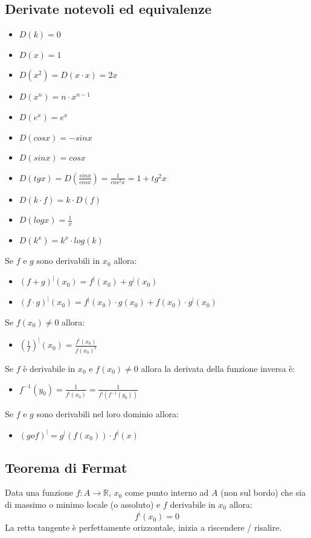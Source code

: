 \documentclass[12pt,a4paper]{article}
\begin{document}
\subsection{Derivate notevoli ed equivalenze}
\begin{itemize}
  \item $D(k) = 0$
  \item $D(x) = 1$
  \item $D(x^2) = D(x \cdot x) = 2x$
  \item $D(x^n) = n \cdot x^{n-1}$
  \item $D(e^x) = e^x$
  \item $D(cosx) = -sinx$
  \item $D(sinx) = cosx$
  \item $D(tgx) = D(\frac{sinx}{cosx}) = \frac{1}{cos^2x} = 1 + tg^2x$
  \item $D(k \cdot f) = k \cdot D(f)$
  \item $D(logx) = \frac{1}{x}$
  \item $D(k^x) = k^x \cdot log(k)$
\end{itemize}
Se $f$ e $g$ sono derivabili in $x_0$ allora:
\begin{itemize}
  \item $(f+g)^|(x_0) = f^|(x_0) + g^|(x_0)$
  \item $(f\cdot g)^|(x_0) = f^|(x_0) \cdot g(x_0) + f(x_0) \cdot g^|(x_0)$
\end{itemize}
Se $f(x_0) \ne 0$ allora:
\begin{itemize}
  \item $(\frac{1}{f})^| (x_0) = \frac{f^|(x_0)}{f(x_0)^2} $
\end{itemize}
Se $f$ è derivabile in $x_0$ e $f(x_0) \ne 0$ allora la derivata della funzione inversa è:
\begin{itemize}
  \item $f^{-1}(y_0) = \frac{1}{f^|(x_0)} = \frac{1}{f^|(f^{-1}(y_0))}$
\end{itemize}
Se $f$ e $g$ sono derivabili nel loro dominio allora:
\begin{itemize}
  \item $(g o f)^| = g^|(f(x_0)) \cdot f^|(x)$
\end{itemize}

\subsection{Teorema di Fermat}
Data una funzione $f: A \rightarrow \mathbb{R}$, $x_0$ come punto interno ad $A$ (non sul bordo) che sia di massimo o minimo locale (o assoluto)
e $f$ derivabile in $x_0$ allora:
\[
f^|(x_0) = 0
\]
La retta tangente è perfettamente orizzontale, inizia a riscendere / risalire.
\end{document}
